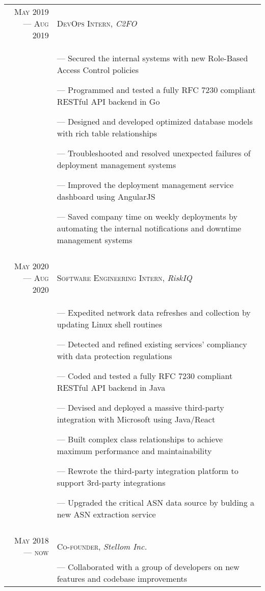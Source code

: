 \documentclass[a4paper, 10pt]{article}
\begin{document}
\begin{tabular}{r|p{12cm}}

	\textsc{May 2019 --- Aug 2019} & \textsc{DevOps Intern}, \emph{C2FO}                                   \\&\footnotesize{
		--- Secured the internal systems with new Role-Based Access Control policies

		--- Programmed and tested a fully RFC 7230 compliant RESTful API backend in Go

		--- Designed and developed optimized database models with rich table relationships

		--- Troubleshooted and resolved unexpected failures of deployment management systems

		--- Improved the deployment management service dashboard using AngularJS

		--- Saved company time on weekly deployments by automating the internal notifications and downtime management systems
	}                                                                                                      \\\multicolumn{2}{c}{}\\

	\textsc{May 2020 --- Aug 2020} & \textsc{Software Engineering Intern}, \emph{RiskIQ}                   \\&\footnotesize{
		--- Expedited network data refreshes and collection by updating Linux shell routines

		--- Detected and refined existing services' compliancy with data protection regulations

		--- Coded and tested a fully RFC 7230 compliant RESTful API backend in Java

		--- Devised and deployed a massive third-party integration with Microsoft using Java/React

		--- Built complex class relationships to achieve maximum performance and maintainability

		--- Rewrote the third-party integration platform to support 3rd-party integrations

		--- Upgraded the critical ASN data source by bulding a new ASN extraction service
	}                                                                                                      \\\multicolumn{2}{c}{}\\

	\textsc{May 2018 --- now}      & \textsc{Co-founder},  \emph{Stellom Inc.}                             \\&\footnotesize{
		--- Collaborated with a group of developers on new features and codebase improvements

}
\end{tabular}
\end{document}
